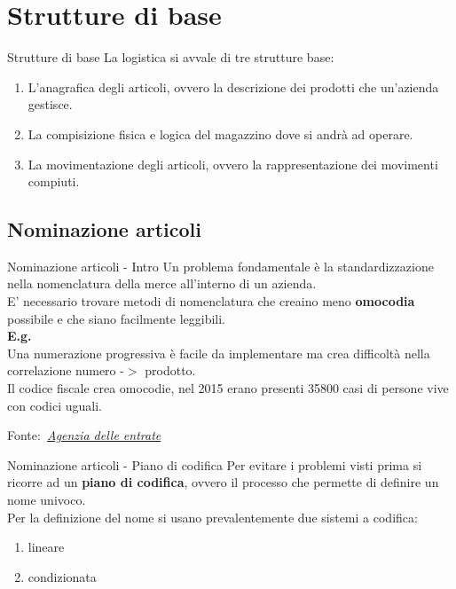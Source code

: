 \documentclass{beamer}
\newcommand{\credit}[1]{\par\hfill \footnotesize Fonte:~\itshape#1}
\begin{document}
\section{Strutture di base}
\begin{frame}{Strutture di base}
    La logistica si avvale di tre strutture base:
    \begin{enumerate}
        \item L'anagrafica degli articoli, ovvero la descrizione dei prodotti che un'azienda gestisce.
        \item La compisizione fisica e logica del magazzino dove si andrà ad operare.
        \item La movimentazione degli articoli, ovvero la rappresentazione dei movimenti compiuti.
    \end{enumerate}
\end{frame}

\subsection{Nominazione articoli}
\begin{frame}{Nominazione articoli -  Intro}
    Un problema fondamentale è la standardizzazione nella nomenclatura della merce all'interno di un azienda.\\
    E' necessario trovare metodi di nomenclatura che creaino meno \textbf{omocodia} possibile e che siano facilmente leggibili.\\
    \vspace{1.5em}
    \textbf{E.g.}\\
    Una numerazione progressiva è facile da implementare ma crea difficoltà nella correlazione numero -$>$ prodotto.\\
    Il codice fiscale crea omocodie, nel 2015 erano presenti 35800 casi di persone vive con codici uguali.
    \credit{\href{https://www.agenziaentrate.gov.it/portale/documents/20143/318757/Audizione+del+Direttore+dell+Agenzia+delle+Entrate+10+02+2016_Audizione+-+Codice+Fiscale+e+Omocodie+-+10+feb+2016+df.pdf/202e5395-f622-62e5-219a-7ce894d538a4}{Agenzia delle entrate}}
\end{frame}

\begin{frame}{Nominazione articoli - Piano di codifica}
    Per evitare i problemi visti prima si ricorre ad un \textbf{piano di codifica}, ovvero il processo che permette di definire un nome univoco.\\
    Per la definizione del nome si usano prevalentemente due sistemi a codifica:
    \begin{enumerate}
        \item lineare
        \item condizionata
    \end{enumerate}
\end{frame}
\end{document}
